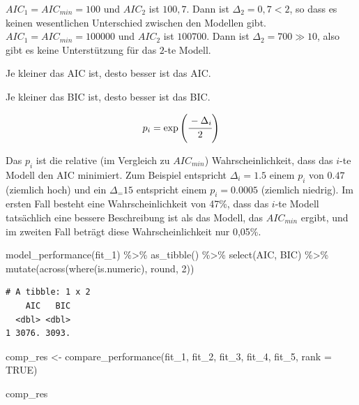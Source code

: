 \documentclass[
  letterpaper,
]{scrbook}
\newenvironment{Shaded}{\begin{snugshade}}{\end{snugshade}}
\newcommand{\AttributeTok}[1]{\textcolor[rgb]{0.40,0.45,0.13}{#1}}
\newcommand{\ConstantTok}[1]{\textcolor[rgb]{0.56,0.35,0.01}{#1}}
\newcommand{\DecValTok}[1]{\textcolor[rgb]{0.68,0.00,0.00}{#1}}
\newcommand{\FunctionTok}[1]{\textcolor[rgb]{0.28,0.35,0.67}{#1}}
\newcommand{\NormalTok}[1]{\textcolor[rgb]{0.00,0.23,0.31}{#1}}
\newcommand{\OtherTok}[1]{\textcolor[rgb]{0.00,0.23,0.31}{#1}}
\newcommand{\SpecialCharTok}[1]{\textcolor[rgb]{0.37,0.37,0.37}{#1}}
\begin{document}
\(AIC_1 = AIC_{min} = 100\) und \(AIC_2\) ist \(100,7\). Dann ist
\(\Delta_2=0,7<2\), so dass es keinen wesentlichen Unterschied zwischen
den Modellen gibt. \(AIC_1 = AIC_{min} = 100000\) und \(AIC_2\) ist
\(100700\). Dann ist \(\Delta_2 = 700 \gg 10\), also gibt es keine
Unterstützung für das \(2\)-te Modell.

Je kleiner das AIC ist, desto besser ist das AIC.

Je kleiner das BIC ist, desto besser ist das BIC.

\[
p_i = \exp\left(\cfrac{-\Delta_i}{2}\right)
\]

Das \(p_i\) ist die relative (im Vergleich zu \(AIC_{min}\))
Wahrscheinlichkeit, dass das \(i\)-te Modell den AIC minimiert. Zum
Beispiel entspricht \(\Delta_i = 1.5\) einem \(p_i\) von \(0.47\)
(ziemlich hoch) und ein \(\Delta_ = 15\) entspricht einem
\(p_i =0.0005\) (ziemlich niedrig). Im ersten Fall besteht eine
Wahrscheinlichkeit von 47\%, dass das \(i\)-te Modell tatsächlich eine
bessere Beschreibung ist als das Modell, das \(AIC_{min}\) ergibt, und
im zweiten Fall beträgt diese Wahrscheinlichkeit nur 0,05\%.

\begin{Shaded}
\begin{Highlighting}[]
\FunctionTok{model\_performance}\NormalTok{(fit\_1) }\SpecialCharTok{\%\textgreater{}\%} 
  \FunctionTok{as\_tibble}\NormalTok{() }\SpecialCharTok{\%\textgreater{}\%} 
  \FunctionTok{select}\NormalTok{(AIC, BIC) }\SpecialCharTok{\%\textgreater{}\%} 
  \FunctionTok{mutate}\NormalTok{(}\FunctionTok{across}\NormalTok{(}\FunctionTok{where}\NormalTok{(is.numeric), round, }\DecValTok{2}\NormalTok{))}
\end{Highlighting}
\end{Shaded}

\begin{verbatim}
# A tibble: 1 x 2
    AIC   BIC
  <dbl> <dbl>
1 3076. 3093.
\end{verbatim}

\begin{Shaded}
\begin{Highlighting}[]
\NormalTok{comp\_res }\OtherTok{\textless{}{-}} \FunctionTok{compare\_performance}\NormalTok{(fit\_1, fit\_2, fit\_3, fit\_4, fit\_5, }\AttributeTok{rank =} \ConstantTok{TRUE}\NormalTok{)}

\NormalTok{comp\_res}
\end{Highlighting}
\end{Shaded}
\end{document}

